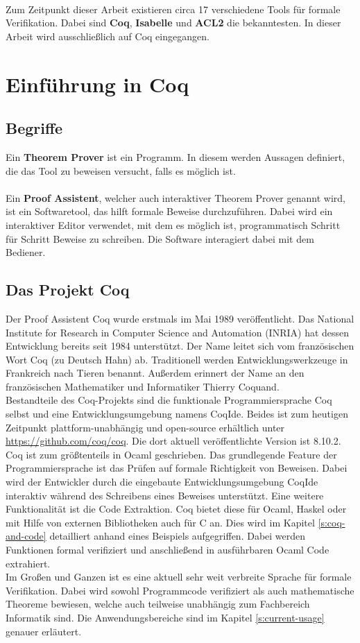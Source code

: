 \\
Zum Zeitpunkt dieser Arbeit existieren circa 17 verschiedene Tools für formale Verifikation. Dabei sind \textbf{Coq}, \textbf{Isabelle} und \textbf{ACL2} die bekanntesten.\cite{WIEDIJK01:FP}
In dieser Arbeit wird ausschließlich auf Coq eingegangen.

\section{Einführung in Coq}
\subsection{Begriffe}
Ein \textbf{Theorem Prover} ist ein Programm.
In diesem werden Aussagen definiert, die das Tool zu beweisen versucht, falls es möglich ist.\\
\\
Ein \textbf{Proof Assistent}, welcher auch interaktiver Theorem Prover genannt wird, ist ein Softwaretool, das hilft formale Beweise durchzuführen. Dabei wird ein interaktiver Editor verwendet, mit dem es möglich ist, programmatisch Schritt für Schritt Beweise zu schreiben. Die Software interagiert dabei mit dem Bediener.
 

\subsection{Das Projekt Coq}
Der Proof Assistent Coq wurde erstmals im Mai 1989 veröffentlicht. Das National Institute for Research in Computer Science and Automation (INRIA) hat dessen Entwicklung bereits seit 1984 unterstützt.\cite{COQ02:FV} Der Name leitet sich vom französischen Wort Coq (zu Deutsch Hahn) ab. Traditionell werden Entwicklungswerkzeuge in Frankreich nach Tieren benannt. Außerdem erinnert der Name an den französischen Mathematiker und Informatiker Thierry Coquand. \\
Bestandteile des Coq-Projekts sind die funktionale Programmiersprache Coq selbst und eine Entwicklungsumgebung namens CoqIde. Beides ist zum heutigen Zeitpunkt plattform-unabhängig und open-source erhältlich unter \url{https://github.com/coq/coq}. Die dort aktuell veröffentlichte Version ist 8.10.2.\cite{COQ01:FV}\\
Coq ist zum größtenteils in Ocaml geschrieben. Das grundlegende Feature der Programmiersprache ist das Prüfen auf formale Richtigkeit von Beweisen. Dabei wird der Entwickler durch die eingebaute Entwicklungsumgebung CoqIde interaktiv während des Schreibens eines Beweises unterstützt. Eine weitere Funktionalität ist die Code Extraktion. Coq bietet diese für Ocaml, Haskel oder mit Hilfe von externen Bibliotheken auch für C an. Dies wird im Kapitel \ref{s:coq-and-code} detailliert anhand eines Beispiels aufgegriffen. Dabei werden Funktionen formal verifiziert und anschließend in ausführbaren Ocaml Code extrahiert.\\
Im Großen und Ganzen ist es eine aktuell sehr weit verbreite Sprache für formale Verifikation. Dabei wird sowohl Programmcode verifiziert als auch mathematische Theoreme bewiesen, welche auch teilweise unabhängig zum Fachbereich Informatik sind. Die Anwendungsbereiche sind im Kapitel \ref{s:current-usage} genauer erläutert.

